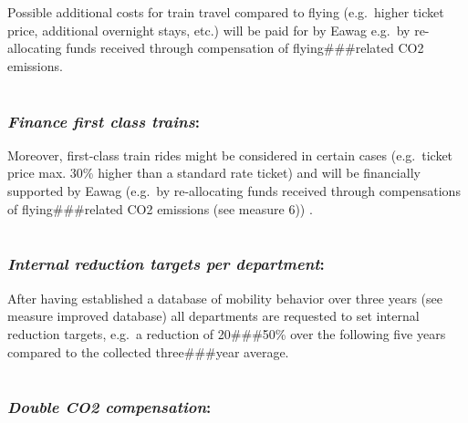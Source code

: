 \documentclass[]{tufte-handout}
\begin{document}
Possible additional costs for train travel compared to flying
(e.g.~higher ticket price, additional overnight stays, etc.) will be
paid for by Eawag e.g.~by re-allocating funds received through
compensation of flying\#\#\#related CO2 emissions.

\hypertarget{train_firstclasse}{%
\section{}\label{train_firstclasse}}

\hypertarget{finance-first-class-trains}{%
\subsubsection{\texorpdfstring{\emph{Finance first class
trains}:}{Finance first class trains:}}\label{finance-first-class-trains}}

Moreover, first-class train rides might be considered in certain cases
(e.g.~ticket price max. 30\% higher than a standard rate ticket) and
will be financially supported by Eawag (e.g.~by re-allocating funds
received through compensations of flying\#\#\#related CO2 emissions (see
measure 6)) .

\hypertarget{internal_competition}{%
\section{}\label{internal_competition}}

\hypertarget{internal-reduction-targets-per-department}{%
\subsubsection{\texorpdfstring{\emph{Internal reduction targets per
department}:}{Internal reduction targets per department:}}\label{internal-reduction-targets-per-department}}

After having established a database of mobility behavior over three
years (see measure improved database) all departments are requested to
set internal reduction targets, e.g.~a reduction of 20\#\#\#50\% over
the following five years compared to the collected three\#\#\#year
average.

\hypertarget{double_compensation}{%
\section{}\label{double_compensation}}

\hypertarget{double-co2-compensation}{%
\subsubsection{\texorpdfstring{\emph{Double CO2
compensation}:}{Double CO2 compensation:}}\label{double-co2-compensation}}
\end{document}
